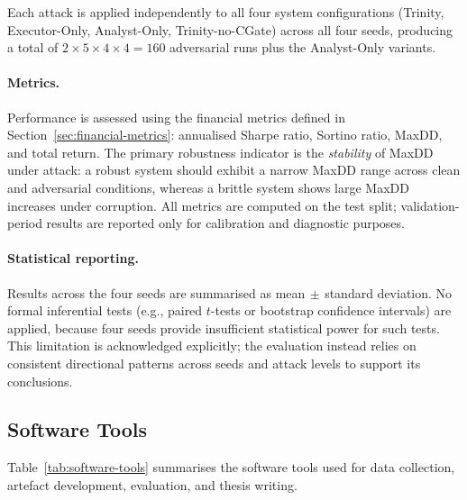 Each attack is applied independently to all four system configurations
(Trinity, Executor-Only, Analyst-Only, Trinity-no-CGate) across all four
seeds, producing a total of $2 \times 5 \times 4 \times 4 = 160$
adversarial runs plus the Analyst-Only variants.

\paragraph{Metrics.}
Performance is assessed using the financial metrics defined in
Section~\ref{sec:financial-metrics}: annualised Sharpe ratio, Sortino
ratio, MaxDD, and total return. The primary robustness
indicator is the \emph{stability} of MaxDD under attack: a
robust system should exhibit a narrow MaxDD range across clean and
adversarial conditions, whereas a brittle system shows large MaxDD
increases under corruption. All metrics are computed on the test split;
validation-period results are reported only for calibration and diagnostic
purposes.

\paragraph{Statistical reporting.}
Results across the four seeds are summarised as mean$\,\pm\,$standard
deviation. No formal inferential tests (e.g., paired $t$-tests or
bootstrap confidence intervals) are applied, because four seeds provide
insufficient statistical power for such tests. This limitation is
acknowledged explicitly; the evaluation instead relies on consistent
directional patterns across seeds and attack levels to support its
conclusions.


\subsection{Software Tools}
\label{sec:software-tools}

Table~\ref{tab:software-tools} summarises the software tools used for
data collection, artefact development, evaluation, and thesis writing.


